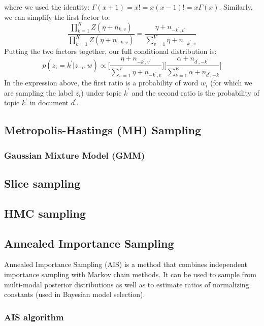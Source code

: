 where we used the identity: $\Gamma(x+1) = x! = x(x-1)! = x\Gamma(x)$. Similarly, we can simplify the first factor to:
\begin{equation}
    \frac{\prod_{k=1}^{K}Z(\eta + n_{k,v})}{\prod_{k=1}^{K}Z(\eta + n_{-k,v})} = \frac{\eta + n_{-k^{\prime}, v^{\prime}}}{\sum_{v=1}^{V}\eta + n_{-k^{\prime}, v}}
\end{equation}
Putting the two factors together, our full conditional distribution is:
\begin{equation}
    p(z_i = k^{\prime}|z_{-i}, w) \propto \bigg[ \frac{\eta + n_{-k^{\prime},v^{\prime}}}{\sum_{v=1}^{V}\eta + n_{-k^{\prime}, v}} \bigg] \bigg[\frac{\alpha + n_{d^{\prime}, -k^{\prime}}}{\sum_{k=1}^{K}\alpha + n_{d^{\prime},-k}} \bigg]
\end{equation}
In the expression above, the first ratio is a probability of word $w_i$ (for which we are sampling the label $z_i$) under topic $k^{\prime}$ and the second ratio is the probability of topic $k^{\prime}$ in document $d^{\prime}$. 

\subsection{Metropolis-Hastings (MH) Sampling}
\subsubsection{Gaussian Mixture Model (GMM)}

\subsection{Slice sampling}
\subsection{HMC sampling}

\subsection{Annealed Importance Sampling}
Annealed Importance Sampling (AIS) is a method that combines independent importance sampling with Markov chain methods. It can be used to sample from multi-modal posterior distributions as well as to estimate ratios of normalizing constants (used in Bayesian model selection).

\subsubsection{AIS algorithm}


